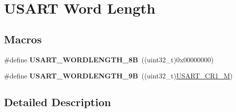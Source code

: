 \hypertarget{group___u_s_a_r_t___word___length}{}\section{U\+S\+A\+RT Word Length}
\label{group___u_s_a_r_t___word___length}
\subsection*{Macros}
\begin{DoxyCompactItemize}
\item 
\#define {\bfseries U\+S\+A\+R\+T\+\_\+\+W\+O\+R\+D\+L\+E\+N\+G\+T\+H\+\_\+8B}~((uint32\+\_\+t)0x00000000)\hypertarget{group___u_s_a_r_t___word___length_gae2978458689a31bed9a8a3e66ed84f50}{}\label{group___u_s_a_r_t___word___length_gae2978458689a31bed9a8a3e66ed84f50}

\item 
\#define {\bfseries U\+S\+A\+R\+T\+\_\+\+W\+O\+R\+D\+L\+E\+N\+G\+T\+H\+\_\+9B}~((uint32\+\_\+t)\hyperlink{group___peripheral___registers___bits___definition_ga95f0288b9c6aaeca7cb6550a2e6833e2}{U\+S\+A\+R\+T\+\_\+\+C\+R1\+\_\+M})\hypertarget{group___u_s_a_r_t___word___length_ga3a8363f7dccf85ccb52d698e0900f347}{}\label{group___u_s_a_r_t___word___length_ga3a8363f7dccf85ccb52d698e0900f347}

\end{DoxyCompactItemize}


\subsection{Detailed Description}
